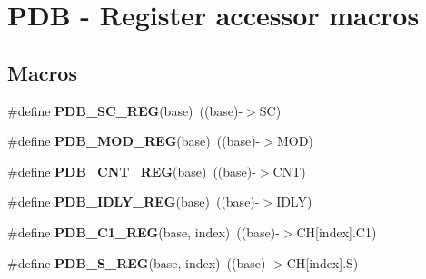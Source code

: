 \hypertarget{group__PDB__Register__Accessor__Macros}{}\section{P\+DB -\/ Register accessor macros}
\label{group__PDB__Register__Accessor__Macros}
\subsection*{Macros}
\begin{DoxyCompactItemize}
\item 
\#define {\bfseries P\+D\+B\+\_\+\+S\+C\+\_\+\+R\+EG}(base)~((base)-\/$>$SC)\hypertarget{group__PDB__Register__Accessor__Macros_gad396df83dcdb6c52e19c05b933ced806}{}\label{group__PDB__Register__Accessor__Macros_gad396df83dcdb6c52e19c05b933ced806}

\item 
\#define {\bfseries P\+D\+B\+\_\+\+M\+O\+D\+\_\+\+R\+EG}(base)~((base)-\/$>$M\+OD)\hypertarget{group__PDB__Register__Accessor__Macros_gab44a66affd75c2b103b25601e02b9fa0}{}\label{group__PDB__Register__Accessor__Macros_gab44a66affd75c2b103b25601e02b9fa0}

\item 
\#define {\bfseries P\+D\+B\+\_\+\+C\+N\+T\+\_\+\+R\+EG}(base)~((base)-\/$>$C\+NT)\hypertarget{group__PDB__Register__Accessor__Macros_ga31689b1e5707390453775501e05c7b16}{}\label{group__PDB__Register__Accessor__Macros_ga31689b1e5707390453775501e05c7b16}

\item 
\#define {\bfseries P\+D\+B\+\_\+\+I\+D\+L\+Y\+\_\+\+R\+EG}(base)~((base)-\/$>$I\+D\+LY)\hypertarget{group__PDB__Register__Accessor__Macros_ga52741bbba3d2a525a775929322a78c75}{}\label{group__PDB__Register__Accessor__Macros_ga52741bbba3d2a525a775929322a78c75}

\item 
\#define {\bfseries P\+D\+B\+\_\+\+C1\+\_\+\+R\+EG}(base,  index)~((base)-\/$>$CH\mbox{[}index\mbox{]}.C1)\hypertarget{group__PDB__Register__Accessor__Macros_ga981d11992d818e9d52a2763041115102}{}\label{group__PDB__Register__Accessor__Macros_ga981d11992d818e9d52a2763041115102}

\item 
\#define {\bfseries P\+D\+B\+\_\+\+S\+\_\+\+R\+EG}(base,  index)~((base)-\/$>$CH\mbox{[}index\mbox{]}.S)\hypertarget{group__PDB__Register__Accessor__Macros_ga1fe8aa6a99bd7bc936a0c1d41a9f217c}{}\label{group__PDB__Register__Accessor__Macros_ga1fe8aa6a99bd7bc936a0c1d41a9f217c}


\end{DoxyCompactItemize}
